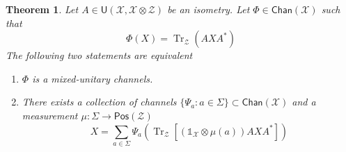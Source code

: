 \documentclass[aps,pra,onecolumn,notitlepage,superscriptaddress]{revtex4-1}
\newcommand{\spc}[1]{\mathcal{#1}}
\newcommand{\Pos}{\mathsf{Pos}}
\newcommand{\U}{\mathsf{U}}
\newcommand{\Tr}{\operatorname{Tr}}
\newcommand{\Chan}{{\mathsf{Chan}}}
\newcommand\I{\mathds{1}}
\newtheorem{theo}{Theorem}
\begin{document}
    \begin{theo}
        Let $A \in \U(\spc X, \spc X \otimes \spc Z)$ be an isometry. Let $\Phi \in \Chan(\spc X)$ such that
        \begin{equation}
            \Phi(X) = \Tr_{\spc Z} (AXA^*)
        \end{equation}
        The following two statements are equivalent
        \begin{enumerate}
            \item $\Phi$ is a mixed-unitary channels.
            \item There exists a collection of channels $\{ \Psi_a : a \in \Sigma \} \subset \Chan(\spc X)$ and a measurement $\mu : \Sigma \to \Pos(\spc Z)$
            \begin{equation}
                X = \sum_{a \in \Sigma} \Psi_a \left( \Tr_{\spc Z} [ (\I_{\spc X} \otimes \mu(a)) AXA^* ] \right)
            \end{equation}
        \end{enumerate}
    \end{theo}
\end{document}
